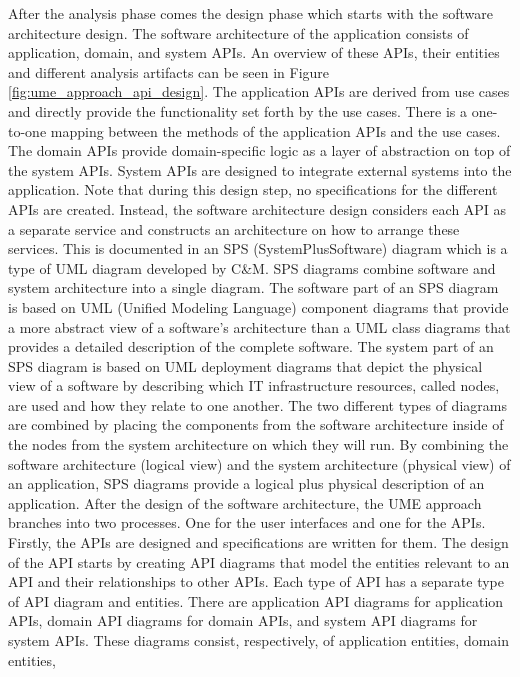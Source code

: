 After the analysis phase comes the design phase which starts with the software architecture design.
The software architecture of the application consists of application, domain, and system APIs.
An overview of these APIs, their entities and different analysis artifacts can be seen in Figure \ref{fig:ume_approach_api_design}.
The application APIs are derived from use cases and directly provide the functionality set forth
by the use cases. There is a one-to-one mapping between the methods of the application APIs and the use cases.
The domain APIs provide domain-specific logic as a layer of abstraction
on top of the system APIs.
System APIs are designed to integrate external systems into the application.
Note that during this design step, no specifications for the different APIs are created.
Instead, the software architecture design considers each API as a separate service
and constructs an architecture on how to arrange these services.
This is documented in an SPS (SystemPlusSoftware) diagram which is a type of UML
diagram developed by C\&M.
SPS diagrams combine software and system architecture into a single diagram.
The software part of an SPS diagram is based on UML (Unified Modeling Language) component diagrams
that provide a more abstract view of a software's architecture than a UML class diagrams that
provides a detailed description of the complete software.
The system part of an SPS diagram is based on UML deployment diagrams that depict
the physical view of a software by describing which IT infrastructure resources, called nodes, are used
and how they relate to one another.
The two different types of diagrams are combined by placing the components from the software architecture
inside of the nodes from the system architecture on which they will run.
By combining the software architecture (logical view)
and the system architecture (physical view) of an application, SPS diagrams provide
a logical plus physical description of an application.
After the design of the software architecture, the UME approach branches into two processes.
One for the user interfaces and one for the APIs.
Firstly, the APIs are designed and specifications are written for them.
The design of the API starts by creating API diagrams that model the entities relevant
to an API and their relationships to other APIs. Each type of API has a separate
type of API diagram and entities. There are application API diagrams for application APIs,
domain API diagrams for domain APIs, and system API diagrams for system APIs.
These diagrams consist, respectively, of application entities, domain entities,
